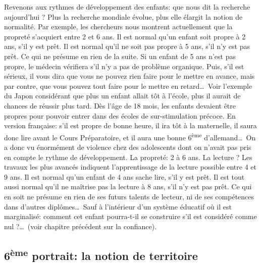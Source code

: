 \documentclass[11pt]{article} %
\begin{document}
  Revenons aux rythmes de développement des enfants: que nous dit la recherche aujourd'hui ? Plus la recherche mondiale évolue, plus elle élargit la notion de normalité. Par exemple, les chercheurs nous montrent actuellement que la propreté s'acquiert entre 2 et 6 ans. Il est normal qu'un enfant soit propre à 2 ans, s'il y est prêt. Il est normal qu'il ne soit pas propre à 5 ans, s'il n'y est pas prêt. Ce qui ne présume en rien de la suite.\newline
  Si un enfant de 5 ans n'est pas propre, le médecin vérifiera s'il n'y a pas de problème organique. Puis, s'il est sérieux, il vous dira que vous ne pouvez rien faire pour le mettre en avance, mais par contre, que vous pouvez tout faire pour le mettre en retard\dots\ Voir l'exemple du Japon considérant que plus un enfant allait tôt à l'école, plus il aurait de chances de réussir plus tard. Dès l'âge de 18 mois, les enfants devaient être propres pour pouvoir entrer dans des écoles de sur-stimulation précoce. En version française: s'il est propre de bonne heure, il ira tôt à la maternelle, il saura donc lire avant le Cours Préparatoire, et il aura une bonne 6\textsuperscript{ème }d'allemand\dots\ On a donc vu énormément de violence chez des adolescents dont on n'avait pas pris en compte le rythme de développement.\newline
  La propreté: 2 à 6 ans. La lecture ? Les travaux les plus avancés indiquent l'apprentissage de la lecture possible entre 4 et 9 ans. Il est normal qu'un enfant de 4 ans sache lire, s'il y est prêt. Il est tout aussi normal qu'il ne maîtrise pas la lecture à 8 ans, s'il n'y est pas prêt. Ce qui en soit ne présume en rien de ses futurs talents de lecteur, ni de ses compétences dans d'autres diplômes\dots\ Sauf à l'intérieur d'un système éducatif où il est marginalisé: comment cet enfant pourra-t-il se construire s'il est considéré comme nul ?\dots\ (voir chapitre précédent sur la confiance).

\subsection{6\textsuperscript{ème} portrait: la notion de territoire }
\end{document}
